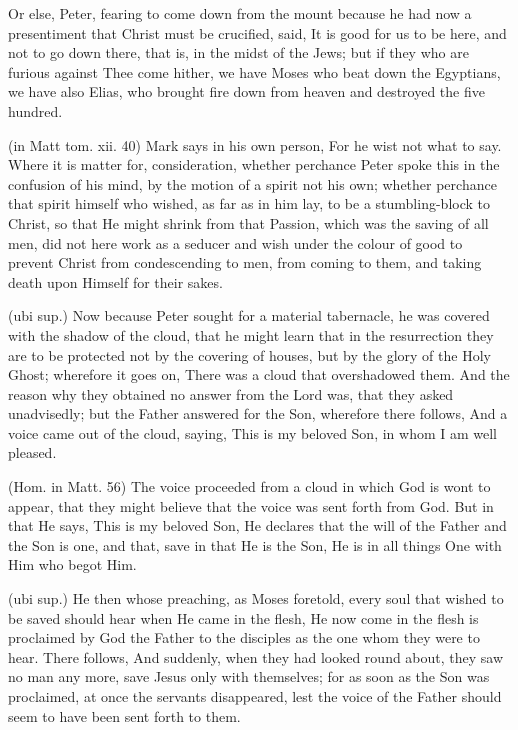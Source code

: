  Or else, Peter, fearing to come down from the mount because he had now a presentiment that Christ must be crucified, said, It is good for us to be here, and not to go down there, that is, in the midst of the Jews; but if they who are furious against Thee come hither, we have Moses who beat down the Egyptians, we have also Elias, who brought fire down from heaven and destroyed the five hundred.

 (in Matt tom. xii. 40) Mark says in his own person, For he wist not what to say. Where it is matter for, consideration, whether perchance Peter spoke this in the confusion of his mind, by the motion of a spirit not his own; whether perchance that spirit himself who wished, as far as in him lay, to be a stumbling-block to Christ, so that He might shrink from that Passion, which was the saving of all men, did not here work as a seducer and wish under the colour of good to prevent Christ from condescending to men, from coming to them, and taking death upon Himself for their sakes.

 (ubi sup.) Now because Peter sought for a material tabernacle, he was covered with the shadow of the cloud, that he might learn that in the resurrection they are to be protected not by the covering of houses, but by the glory of the Holy Ghost; wherefore it goes on, There was a cloud that overshadowed them. And the reason why they obtained no answer from the Lord was, that they asked unadvisedly; but the Father answered for the Son, wherefore there follows, And a voice came out of the cloud, saying, This is my beloved Son, in whom I am well pleased.

 (Hom. in Matt. 56) The voice proceeded from a cloud in which God is wont to appear, that they might believe that the voice was sent forth from God. But in that He says, This is my beloved Son, He declares that the will of the Father and the Son is one, and that, save in that He is the Son, He is in all things One with Him who begot Him.

 (ubi sup.) He then whose preaching, as Moses foretold, every soul that wished to be saved should hear when He came in the flesh, He now come in the flesh is proclaimed by God the Father to the disciples as the one whom they were to hear. There follows, And suddenly, when they had looked round about, they saw no man any more, save Jesus only with themselves; for as soon as the Son was proclaimed, at once the servants disappeared, lest the voice of the Father should seem to have been sent forth to them.

